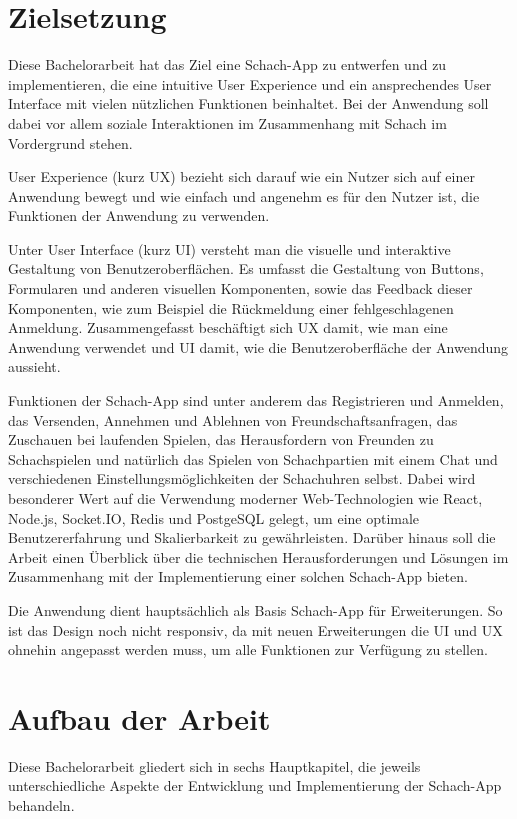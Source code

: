     \section{Zielsetzung}
    Diese Bachelorarbeit hat das Ziel eine Schach-App zu entwerfen und zu implementieren, die eine intuitive User Experience und ein ansprechendes User Interface mit vielen nützlichen Funktionen beinhaltet. Bei der Anwendung soll dabei vor allem soziale Interaktionen im Zusammenhang mit Schach im Vordergrund stehen.
    
User Experience (kurz UX) bezieht sich darauf wie ein Nutzer sich auf einer Anwendung bewegt und wie einfach und angenehm es für den Nutzer ist, die Funktionen der Anwendung zu verwenden.
    
    Unter User Interface (kurz UI) versteht man die visuelle und interaktive Gestaltung von Benutzeroberflächen. Es umfasst die Gestaltung von Buttons, Formularen und anderen visuellen Komponenten, sowie das Feedback dieser Komponenten, wie zum Beispiel die Rückmeldung einer fehlgeschlagenen Anmeldung.
    Zusammengefasst beschäftigt sich UX damit, wie man eine Anwendung verwendet und UI damit, wie die Benutzeroberfläche der Anwendung aussieht.\cite{webdesign}
        
        Funktionen der Schach-App sind unter anderem das Registrieren und Anmelden, das Versenden, Annehmen und Ablehnen von Freundschaftsanfragen, das Zuschauen bei laufenden Spielen, das Herausfordern von Freunden zu Schachspielen und natürlich das Spielen von Schachpartien mit einem Chat und verschiedenen Einstellungsmöglichkeiten der Schachuhren selbst.
    Dabei wird besonderer Wert auf die Verwendung moderner Web-Technologien wie React, Node.js, Socket.IO, Redis und PostgeSQL gelegt, um eine optimale Benutzererfahrung und Skalierbarkeit zu gewährleisten. Darüber hinaus soll die Arbeit einen Überblick über die technischen Herausforderungen und Lösungen im Zusammenhang mit der Implementierung einer solchen Schach-App bieten.
    
Die Anwendung dient hauptsächlich als Basis Schach-App für Erweiterungen. So ist das Design noch nicht responsiv, da mit neuen Erweiterungen die UI und UX ohnehin angepasst werden muss, um alle Funktionen zur Verfügung zu stellen.
    
    \section{Aufbau der Arbeit}
Diese Bachelorarbeit gliedert sich in sechs Hauptkapitel, die jeweils unterschiedliche Aspekte der Entwicklung und Implementierung der Schach-App behandeln.

